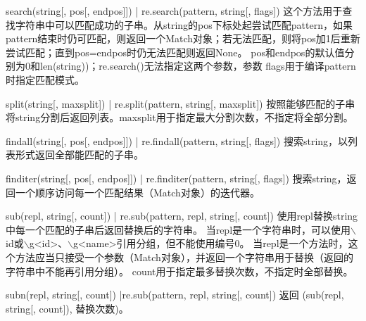 \documentclass[5pt,a4paper,twocolumn]{article}
\begin{document}
search(string[, pos[, endpos]]) | re.search(pattern, string[, flags])
这个方法用于查找字符串中可以匹配成功的子串。从string的pos下标处起尝试匹配pattern，如果pattern结束时仍可匹配，则返回一个Match对象；若无法匹配，则将pos加1后重新尝试匹配；直到pos=endpos时仍无法匹配则返回None。 
pos和endpos的默认值分别为0和len(string))；re.search()无法指定这两个参数，参数 flags用于编译pattern时指定匹配模式。

split(string[, maxsplit]) | re.split(pattern, string[, maxsplit])
按照能够匹配的子串将string分割后返回列表。maxsplit用于指定最大分割次数，不指定将全部分割。 

findall(string[, pos[, endpos]]) | re.findall(pattern, string[, flags])
搜索string，以列表形式返回全部能匹配的子串。 

finditer(string[, pos[, endpos]]) | re.finditer(pattern, string[, flags])
搜索string，返回一个顺序访问每一个匹配结果（Match对象）的迭代器。 

sub(repl, string[, count]) | re.sub(pattern, repl, string[, count])
使用repl替换string中每一个匹配的子串后返回替换后的字符串。 
当repl是一个字符串时，可以使用$\backslash$id或$\backslash$g<id>、$\backslash$g<name>引用分组，但不能使用编号0。 
当repl是一个方法时，这个方法应当只接受一个参数（Match对象），并返回一个字符串用于替换（返回的字符串中不能再引用分组）。 
count用于指定最多替换次数，不指定时全部替换。 

subn(repl, string[, count]) |re.sub(pattern, repl, string[, count])
返回 (sub(repl, string[, count]), 替换次数)。 
\end{document}
